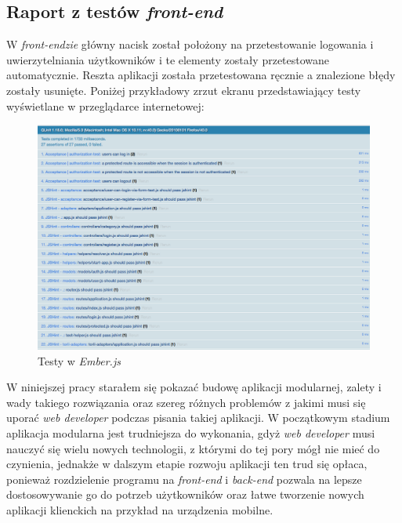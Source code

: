 \documentclass[openright]{xmgr}
\begin{document}
\subsection{Raport z testów \textit{front-end}}
W \textit{front-endzie} główny nacisk został położony na przetestowanie logowania i uwierzytelniania użytkowników i te elementy zostały przetestowane automatycznie. Reszta aplikacji została przetestowana ręcznie a znalezione błędy zostały usunięte. Poniżej przykładowy zrzut ekranu przedstawiający testy wyświetlane w przeglądarce internetowej:
\begin{figure}[H]
\centering
\includegraphics[width=1\hsize]{images/ember-testy.png}
\caption{Testy w \textit{Ember.js}\label{RYS.1}}
\end{figure}
\summary
W niniejszej pracy starałem się pokazać budowę aplikacji modularnej, zalety i wady takiego rozwiązania oraz szereg różnych problemów z jakimi musi się uporać \textit{web developer} podczas pisania takiej aplikacji. W początkowym stadium aplikacja modularna jest trudniejsza do wykonania, gdyż \textit{web developer} musi nauczyć się wielu nowych technologii, z którymi do tej pory mógł nie mieć do czynienia, jednakże w dalszym etapie rozwoju aplikacji ten trud się opłaca, ponieważ rozdzielenie programu na \textit{front-end} i \textit{back-end} pozwala na lepsze dostosowywanie go do potrzeb użytkowników oraz łatwe tworzenie nowych aplikacji klienckich na przykład na urządzenia mobilne.
\end{document}
